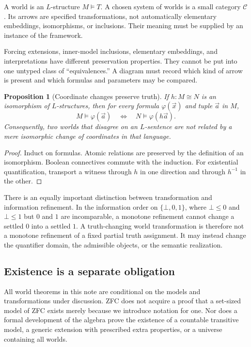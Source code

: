 \documentclass[11pt,letterpaper]{article}
\newtheorem{proposition}[theorem]{Proposition}
\theoremstyle{definition}
\begin{document}
A world is an $L$-structure $M\models T$. A chosen system of worlds is a small category $\mathcal C$. Its arrows are specified transformations, not automatically elementary embeddings, isomorphisms, or inclusions. Their meaning must be supplied by an instance of the framework.

Forcing extensions, inner-model inclusions, elementary embeddings, and interpretations have different preservation properties. They cannot be put into one untyped class of ``equivalences.'' A diagram must record which kind of arrow is present and which formulas and parameters may be compared.

\begin{proposition}[Coordinate changes preserve truth]\label{prop:coordinates}
If $h:M\cong N$ is an isomorphism of $L$-structures, then for every formula $\varphi(\vec x)$ and tuple $\vec a$ in $M$,
\[
M\models\varphi(\vec a)\quad\Longleftrightarrow\quad
N\models\varphi(h\vec a).
\]
Consequently, two worlds that disagree on an $L$-sentence are not related by a mere isomorphic change of coordinates in that language.
\end{proposition}
\begin{proof}
Induct on formulas. Atomic relations are preserved by the definition of an isomorphism. Boolean connectives commute with the induction. For existential quantification, transport a witness through $h$ in one direction and through $h^{-1}$ in the other.
\end{proof}

There is an equally important distinction between transformation and information refinement. In the information order on $\{\bot,0,1\}$, where $\bot\leq0$ and $\bot\leq1$ but $0$ and $1$ are incomparable, a monotone refinement cannot change a settled $0$ into a settled $1$. A truth-changing world transformation is therefore not a monotone refinement of a fixed partial truth assignment. It may instead change the quantifier domain, the admissible objects, or the semantic realization.

\subsection{Existence is a separate obligation}
All world theorems in this note are conditional on the models and transformations under discussion. ZFC does not acquire a proof that a set-sized model of ZFC exists merely because we introduce notation for one. Nor does a formal development of the algebra prove the existence of a countable transitive model, a generic extension with prescribed extra properties, or a universe containing all worlds.
\end{document}
